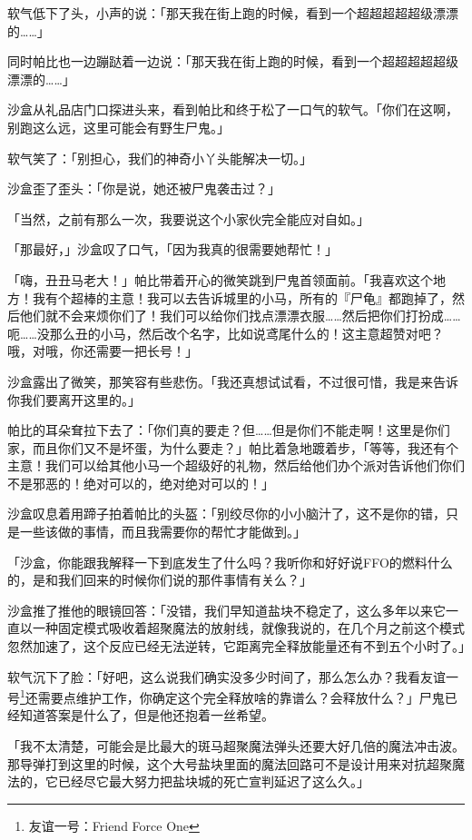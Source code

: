 软气低下了头，小声的说：「那天我在街上跑的时候，看到一个超超超超超级漂漂的……」

同时帕比也一边蹦跶着一边说：「那天我在街上跑的时候，看到一个超超超超超级漂漂的……」

\horizonline


沙盒从礼品店门口探进头来，看到帕比和终于松了一口气的软气。「你们在这啊，别跑这么远，这里可能会有野生尸鬼。」

软气笑了：「别担心，我们的神奇小丫头能解决一切。」

沙盒歪了歪头：「你是说，她还被尸鬼袭击过？」

「当然，之前有那么一次，我要说这个小家伙完全能应对自如。」

「那最好，」沙盒叹了口气，「因为我真的很需要她帮忙！」

「嗨，丑丑马老大！」帕比带着开心的微笑跳到尸鬼首领面前。「我喜欢这个地方！我有个超棒的主意！我可以去告诉城里的小马，所有的『尸龟』都跑掉了，然后他们就不会来烦你们了！我们可以给你们找点漂漂衣服……然后把你们打扮成……呃……没那么丑的小马，然后改个名字，比如说鸢尾什么的！这主意超赞对吧？哦，对哦，你还需要一把长号！」

沙盒露出了微笑，那笑容有些悲伤。「我还真想试试看，不过很可惜，我是来告诉你我们要离开这里的。」

帕比的耳朵耷拉下去了：「你们真的要走？但……但是你们不能走啊！这里是你们家，而且你们又不是坏蛋，为什么要走？」帕比着急地踱着步，「等等，我还有个主意！我们可以给其他小马一个超级好的礼物，然后给他们办个派对告诉他们你们不是邪恶的！绝对可以的，绝对绝对可以的！」

沙盒叹息着用蹄子拍着帕比的头盔：「别绞尽你的小小脑汁了，这不是你的错，只是一些该做的事情，而且我需要你的帮忙才能做到。」

「沙盒，你能跟我解释一下到底发生了什么吗？我听你和好好说FFO的燃料什么的，是和我们回来的时候你们说的那件事情有关么？」

沙盒推了推他的眼镜回答：「没错，我们早知道盐块不稳定了，这么多年以来它一直以一种固定模式吸收着超聚魔法的放射线，就像我说的，在几个月之前这个模式忽然加速了，这个反应已经无法逆转，它距离完全释放能量还有不到五个小时了。」

软气沉下了脸：「好吧，这么说我们确实没多少时间了，那么怎么办？我看友谊一号\footnote{友谊一号：Friend Force One}还需要点维护工作，你确定这个完全释放啥的靠谱么？会释放什么？」尸鬼已经知道答案是什么了，但是他还抱着一丝希望。

「我不太清楚，可能会是比最大的斑马超聚魔法弹头还要大好几倍的魔法冲击波。那导弹打到这里的时候，这个大号盐块里面的魔法回路可不是设计用来对抗超聚魔法的，它已经尽它最大努力把盐块城的死亡宣判延迟了这么久。」


